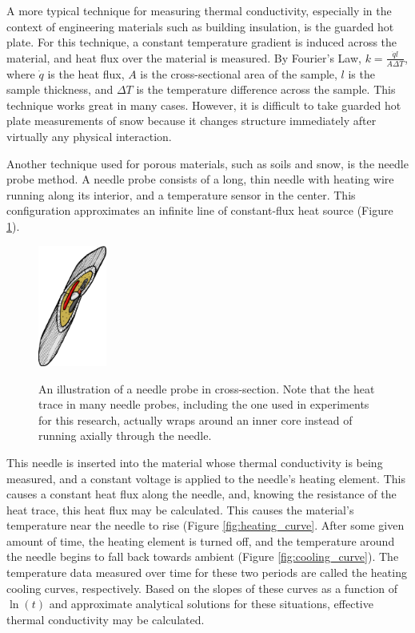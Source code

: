 A more typical technique for measuring thermal conductivity, especially in the
context of engineering materials such as building insulation, is the guarded
hot plate. For this technique, a constant temperature gradient is induced across
the material, and heat flux over the material is measured.  By Fourier's Law,
\(k = \frac{\dot{q}l}{A\Delta T}\), where \(\dot{q}\) is the heat flux, \(A\) is
the cross-sectional area of the sample, \(l\) is the sample thickness, and 
\(\Delta T\) is the temperature difference across the sample. This technique
works great in many cases. However, it is difficult to take guarded hot plate
measurements of snow because it changes structure immediately after virtually
any physical interaction.

Another technique used for porous materials, such as soils and snow, is the
needle probe method. A needle probe consists of a long, thin needle with heating
wire running along its interior, and a temperature sensor in the center. This
configuration approximates an infinite line of constant-flux heat source
(Figure \ref{fig:needle_xsect}). \cite{basictheory}

\begin{figure}[h]
\centering
\includegraphics[width=0.2\textwidth]{fig/needle_xsect.png}
\label{fig:needle_xsect}
\caption{An illustration of a needle probe in cross-section. Note that the heat
trace in many needle probes, including the one used in experiments for this
research, actually wraps around an inner core instead of running axially through
the needle.}
\end{figure}

This needle is inserted into the material whose thermal conductivity is being
measured, and a constant voltage is applied to the needle's heating element.
This causes a constant heat flux along the needle, and, knowing the resistance
of the heat trace, this heat flux may be calculated. This causes the material's
temperature near the needle to rise (Figure \ref{fig:heating_curve}. After some
given amount of time, the heating element is turned off, and the temperature
around the needle begins to fall back towards ambient (Figure \ref{fig:cooling_curve}).
The temperature data measured over time for these two periods are called the
heating cooling curves, respectively.  Based on the slopes of these
curves as a function of \(\ln(t)\) and approximate analytical solutions for
these situations, effective thermal conductivity may be calculated.

